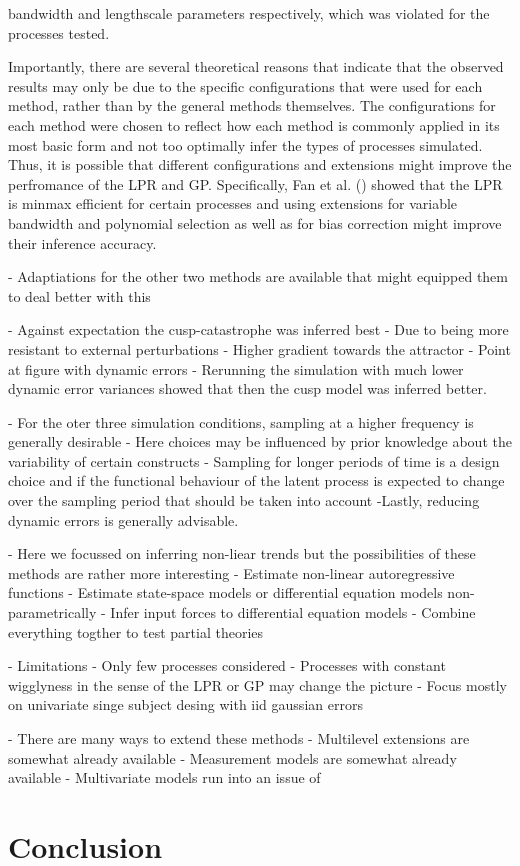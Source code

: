 \documentclass[man, floatsintext]{apa7}
\begin{document}
bandwidth and lengthscale parameters respectively, which was violated for the
processes tested.

Importantly, there are several theoretical reasons that indicate that the
observed results may only be due to the specific configurations
that were used for each method, rather than by the general methods
themselves. The configurations for each method were chosen to reflect
how each method is commonly applied in its most basic form and not too
optimally infer the types of processes simulated. Thus, it is possible
that different configurations and extensions might improve the perfromance
of the LPR and GP\@. Specifically, Fan et al. () showed that the LPR is
minmax efficient for certain processes and using extensions for variable
bandwidth and polynomial selection as well as for bias correction
might improve their inference accuracy.

- Adaptiations for the other two methods are available that might equipped
them to deal better with this

- Against expectation the cusp-catastrophe was inferred best
- Due to being more resistant to external perturbations
- Higher gradient towards the attractor
- Point at figure with dynamic errors
- Rerunning the simulation with much lower dynamic error variances showed
that then the cusp model was inferred better.

- For the oter three simulation conditions, sampling at a higher frequency is
generally desirable
- Here choices may be influenced by prior knowledge about the variability
of certain constructs
- Sampling for longer periods of time is a design choice and if the
functional behaviour of the latent process is expected to change over the
sampling period that should be taken into account
-Lastly, reducing dynamic errors is generally advisable.

- Here we focussed on inferring non-liear trends but the possibilities of
these methods are rather more interesting
- Estimate non-linear autoregressive functions
- Estimate state-space models or differential equation models
non-parametrically
- Infer input forces to differential equation models
- Combine everything togther to test partial theories

- Limitations
- Only few processes considered
- Processes with constant wigglyness in the sense of the LPR or GP may change
the picture
- Focus mostly on univariate singe subject desing with iid gaussian errors

- There are many ways to extend these methods
- Multilevel extensions are somewhat already available
- Measurement models are somewhat already available
- Multivariate models run into an issue of

\section{Conclusion}

\printbibliography[]
\end{document}

